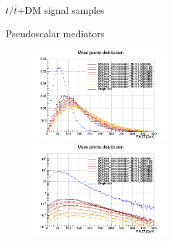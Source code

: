 \documentclass[8pt]{beamer}
\begin{document}
\begin{frame}{$t/\bar t$+DM signal samples}
\vspace{-5pt}
\begin{block}{\centering Pseudoscalar mediators}\end{block} \vspace{-10pt}
\begin{figure}[htbp]
\centering
\begin{minipage}[b]{.49\textwidth}
\begin{center}
\includegraphics[width=5.2cm, height=3.5cm]{figs/singleTopPseudoMETNorm.png}
\end{center}
\end{minipage}\hfill
\begin{minipage}[b]{.49\textwidth}
\begin{center}
\includegraphics[width=5.2cm, height=3.5cm]{figs/singleTopPseudoMET.png}
\end{center}
\end{minipage} \hfill
\end{figure} \vfill
\end{frame}
\end{document}
